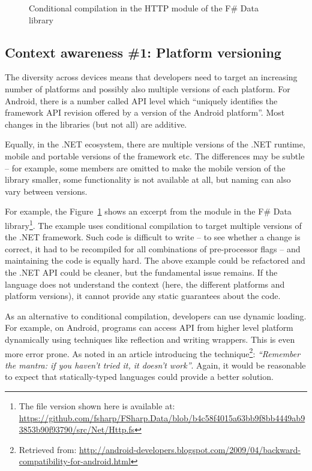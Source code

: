 \begin{figure}
\vspace{1em}
\noindent\makebox[\linewidth]{\rule{\textwidth}{0.5pt}} 
\vspace{-1.5em}
\caption{Conditional compilation in the HTTP module of the F\# Data library}
\label{fig:introduction-context-http}
\end{figure}


\subsection{Context awareness \#1: Platform versioning}

The diversity across devices means that developers need to target an increasing number of platforms
and possibly also multiple versions of each platform. For Android, there is a number called 
API level \cite{app-android-apilevel} which ``uniquely identifies the framework API revision offered 
by a version of the Android platform''. Most changes in the libraries (but not all) are additive.

Equally, in the .NET ecosystem, there are multiple versions of the .NET runtime, mobile and 
portable versions of the framework etc. The differences may be subtle -- for example, some members
are omitted to make the mobile version of the library smaller, some functionality is not available
at all, but naming can also vary between versions.

For example, the Figure~\ref{fig:introduction-context-http} shows an excerpt from the  module 
in the F\# Data library\footnote{The file version shown here is available at:
\url{https://github.com/fsharp/FSharp.Data/blob/b4c58f4015a63bb9f8bb4449ab93853b90f93790/src/Net/Http.fs}}.
The example uses conditional compilation to target multiple versions of the .NET framework. Such code
is difficult to write -- to see whether a change is correct, it had to be recompiled for all combinations
of pre-processor flags -- and maintaining the code is equally hard. The above example could be refactored
and the .NET API could be cleaner, but the fundamental issue remains. If the language does not understand
the context (here, the different platforms and platform versions), it cannot provide any static
guarantees about the code.

As an alternative to conditional compilation, developers can use dynamic loading. For example, 
on Android, programs can access API from higher level platform dynamically using techniques like 
reflection and writing wrappers. This is even more error prone. As noted in an article introducing
the technique\footnote{Retrieved from: \url{http://android-developers.blogspot.com/2009/04/backward-}\\\url{compatibility-for-android.html}}:
\emph{``Remember the mantra: if you haven't tried it, it doesn't work''}. Again, it would be 
reasonable to expect that statically-typed languages could provide a better solution.

